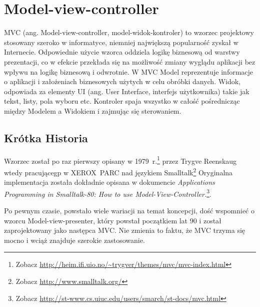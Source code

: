 \documentclass[a4paper,12pt,oneside]{report}
\begin{document}
\section{Model-view-controller}
\label{sec:mvc}
MVC (ang. Model-view-controller, model-widok-kontroler) to wzorzec projektowy stosowany szeroko w informatyce, niemniej największą popularność zyskał w Internecie. Odpowiednie użycie wzorca oddziela logikę biznesową od warstwy prezentacji, co w efekcie przekłada się na możliwość zmiany wyglądu aplikacji bez wpływu na logikę biznesową i odwrotnie. W MVC Model reprezentuje informacje o aplikacji i założeniach biznesowych użytych w celu obróbki danych. Widok, odpowiada za elementy UI (ang. User Interface, interfejs użytkownika) takie jak tekst, listy, pola wyboru etc. Kontroler spaja wszystko w całość pośrednicząc między Modelem a Widokiem i zajmując się sterowaniem.

\subsection{Krótka Historia}
\label{subsec:mvc-historia}
Wzorzec został po raz pierwszy opisany w 1979~r.\footnote{Zobacz \url{http://heim.ifi.uio.no/~trygver/themes/mvc/mvc-index.html}} przez Trygve Reenskaug wtedy pracującegp w XEROX~PARC nad językiem Smalltalk\footnote{Zobacz \url{http://www.smalltalk.org/}} Oryginalna implementacja została dokładnie opisana w dokumencie \emph{Applications Programming in Smalltalk-80: How to use Model-View-Controller.}\footnote{Zobacz \url{http://st-www.cs.uiuc.edu/users/smarch/st-docs/mvc.html}}.

Po pewnym czasie, powstało wiele wariacji na temat koncepcji, dość wspomnieć o wzorcu Model-view-presenter, który powstał początkiem lat 90 i został zaprojektowany jako następca MVC. Nie zmienia to faktu, że MVC trzyma się mocno i wciąż znajduje szerokie zastosowanie.
\end{document}

